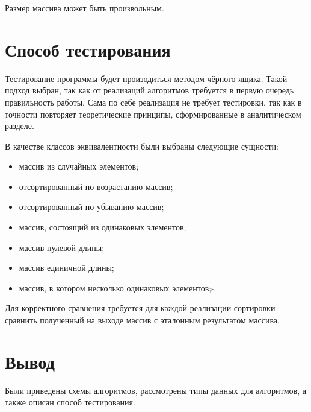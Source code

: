 Размер массива может быть произвольным.

\section{Способ тестирования}
Тестирование программы будет произодиться методом чёрного ящика.
Такой подход выбран, так как от реализаций алгоритмов требуется в первую
очередь правильность работы.
Сама по себе реализация не требует тестировки, так как в точности
повторяет теоретические принципы, сформированные в аналитическом
разделе.

В качестве классов эквивалентности были выбраны следующие сущности:
\begin{itemize}
	\item массив из случайных элементов;
	\item отсортированный по возрастанию массив;
	\item отсортированный по убыванию массив;
	\item массив, состоящий из одинаковых элементов;
	\item массив нулевой длины;
	\item массив единичной длины;
	\item массив, в котором несколько одинаковых элементов;s
\end{itemize}

Для корректного сравнения требуется для каждой реализации сортировки
сравнить полученный на выходе массив с эталонным результатом массива.

\section{Вывод}
Были приведены схемы алгоритмов, рассмотрены типы данных
для алгоритмов, а также описан способ тестирования.